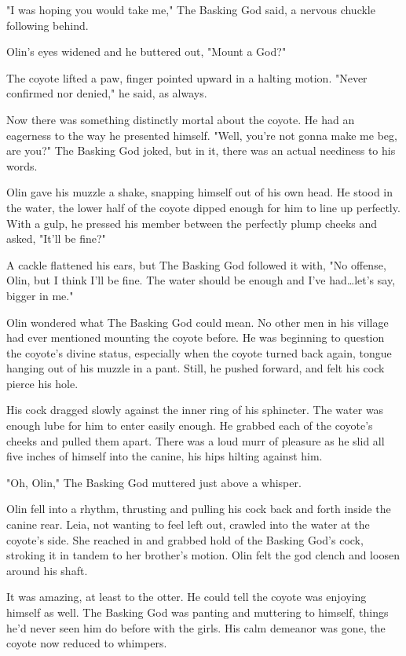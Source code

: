 "I was hoping you would take me," The Basking God said, a nervous chuckle following behind.

Olin's eyes widened and he buttered out, "Mount a God?"

The coyote lifted a paw, finger pointed upward in a halting motion. "Never confirmed nor denied," he said, as always.

Now there was something distinctly mortal about the coyote. He had an eagerness to the way he presented himself. "Well, you're not gonna make me beg, are you?" The Basking God joked, but in it, there was an actual neediness to his words.

Olin gave his muzzle a shake, snapping himself out of his own head. He stood in the water, the lower half of the coyote dipped enough for him to line up perfectly. With a gulp, he pressed his member between the perfectly plump cheeks and asked, "It'll be fine?"

A cackle flattened his ears, but The Basking God followed it with, "No offense, Olin, but I think I'll be fine. The water should be enough and I've had\ldots let's say, bigger in me."

Olin wondered what The Basking God could mean. No other men in his village had ever mentioned mounting the coyote before. He was beginning to question the coyote's divine status, especially when the coyote turned back again, tongue hanging out of his muzzle in a pant. Still, he pushed forward, and felt his cock pierce his hole.

His cock dragged slowly against the inner ring of his sphincter. The water was enough lube for him to enter easily enough. He grabbed each of the coyote's cheeks and pulled them apart. There was a loud murr of pleasure as he slid all five inches of himself into the canine, his hips hilting against him.

"Oh, Olin," The Basking God muttered just above a whisper.

Olin fell into a rhythm, thrusting and pulling his cock back and forth inside the canine rear. Leia, not wanting to feel left out, crawled into the water at the coyote's side. She reached in and grabbed hold of the Basking God's cock, stroking it in tandem to her brother's motion. Olin felt the god clench and loosen around his shaft.

It was amazing, at least to the otter. He could tell the coyote was enjoying himself as well. The Basking God was panting and muttering to himself, things he'd never seen him do before with the girls. His calm demeanor was gone, the coyote now reduced to whimpers.

